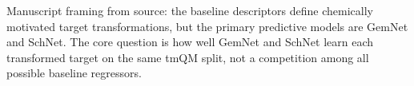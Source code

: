 Manuscript framing from source: the baseline descriptors define chemically motivated target transformations, but the primary predictive models are GemNet and SchNet. The core question is how well GemNet and SchNet learn each transformed target on the same tmQM split, not a competition among all possible baseline regressors.
